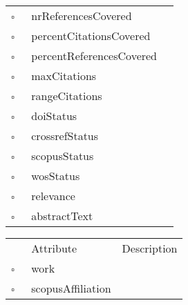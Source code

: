 \begin{table}
\begin{longtable}{llp{8cm}}
$\square$\ & nrReferencesCovered &  \\
$\square$\ & percentCitationsCovered &  \\
$\square$\ & percentReferencesCovered &  \\
$\square$\ & maxCitations &  \\
$\square$\ & rangeCitations &  \\
$\square$\ & doiStatus &  \\
$\square$\ & crossrefStatus &  \\
$\square$\ & scopusStatus &  \\
$\square$\ & wosStatus &  \\
$\square$\ & relevance &  \\
$\square$\ & abstractText &  \\
\end{longtable}
\label{attr:Work}
\end{table}

\clearpage
\begin{table}
\caption{WorkAffiliation  }

\begin{longtable}{llp{8cm}}
& Attribute & Description \\
$\square$\ & work &  \\
$\square$\ & scopusAffiliation &  \\
\end{longtable}
\label{attr:WorkAffiliation}
\end{table}
